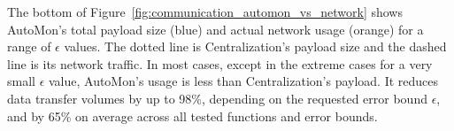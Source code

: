 The bottom of Figure~\ref{fig:communication_automon_vs_network} shows AutoMon's total payload size (blue) and actual network usage (orange) for a range of $\epsilon$ values.
The dotted line is Centralization's payload size and the dashed line is its network traffic.
In most cases, except in the extreme cases for a very small $\epsilon$ value, AutoMon's usage is less than Centralization's payload.
It reduces data transfer volumes by up to 98\%, depending on the requested error bound $\epsilon$, and by 65\% on average across all tested functions and error bounds.
